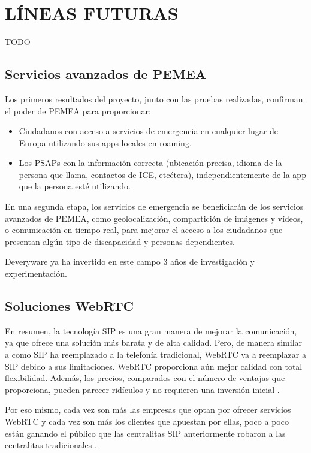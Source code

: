 \chapter{LÍNEAS FUTURAS\label{sec:lineasfuturas}}

\clearpage

TODO

\section{Servicios avanzados de PEMEA}

Los primeros resultados del proyecto, junto con las pruebas realizadas, confirman el poder de PEMEA para proporcionar:

\begin{itemize}
  \item Ciudadanos con acceso a servicios de emergencia en cualquier lugar de Europa utilizando sus apps locales en roaming.
  \item Los PSAPs con la información correcta (ubicación precisa, idioma de la persona que llama, contactos de ICE, etcétera), independientemente de la app que la persona esté utilizando.
\end{itemize}

En una segunda etapa, los servicios de emergencia se beneficiarán de los servicios avanzados de PEMEA, como geolocalización, compartición de imágenes y vídeos, o comunicación en tiempo real, para mejorar el acceso a los ciudadanos que presentan algún tipo de discapacidad y personas dependientes.

Deveryware ya ha invertido en este campo 3 años de investigación y experimentación.

\section{Soluciones WebRTC}

En resumen, la tecnología SIP es una gran manera de mejorar la comunicación, ya que ofrece una solución más barata y de alta calidad. Pero, de manera similar a como SIP ha reemplazado a la telefonía tradicional, WebRTC va a reemplazar a SIP debido a sus limitaciones. WebRTC proporciona aún mejor calidad con total flexibilidad. Además, los precios, comparados con el número de ventajas que proporciona, pueden parecer ridículos y no requieren una inversión inicial \cite{webrtc2}.

Por eso mismo, cada vez son más las empresas que optan por ofrecer servicios WebRTC y cada vez son más los clientes que apuestan por ellas, poco a poco están ganando el público que las centralitas SIP anteriormente robaron a las centralitas tradicionales \cite{webrtc1}.

